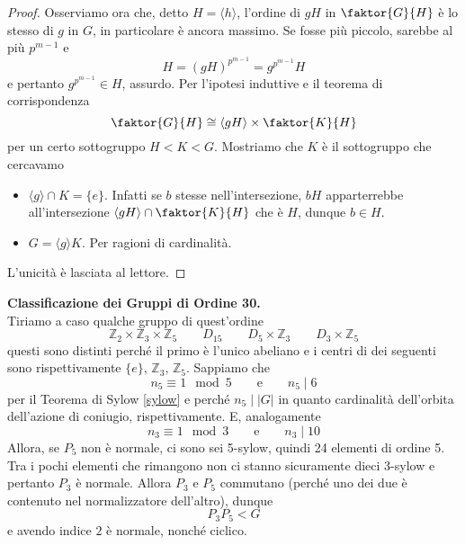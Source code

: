 \documentclass[a4paper]{article}
\theoremstyle{remark}
\theoremstyle{definition}
\begin{document}
\begin{multicols}{2}
\begin{proof}
	Osserviamo ora che, detto $ H = \langle h \rangle $, l'ordine di $ gH $ in $ \faktor{G}{H} $ è lo stesso di $ g $ in $ G $, in particolare è ancora massimo. Se fosse più piccolo, sarebbe al più $ p^{m-1} $ e
	\[ H = (gH)^{p^{m-1}} = g^{p^{m-1}}H \]
	e pertanto $ g^{p^{m-1}} \in H $, assurdo.
	 Per l'ipotesi induttive e il teorema di corrispondenza
	\[ \faktor{G}{H} \cong \langle gH \rangle \times \faktor{K}{H} \]
	per un certo sottogruppo $ H < K < G $. Mostriamo che $ K $ è il sottogruppo che cercavamo
	\begin{itemize}
		\item $ \langle g \rangle \cap K = \{e\} $. Infatti se $ b $ stesse nell'intersezione, $ bH $ apparterrebbe all'intersezione $ \langle gH \rangle \cap \faktor{K}{H} $ che è $ H $, dunque $ b \in H $.
		\item $ G = \langle g \rangle K $. Per ragioni di cardinalità. 
	\end{itemize}

L'unicità è lasciata al lettore.

\end{proof}
	
\textbf{Classificazione dei Gruppi di Ordine 30.}\\
Tiriamo a caso qualche gruppo di quest'ordine
\[ \boxed{\mathbb{Z}_2\times\mathbb{Z}_3\times\mathbb{Z}_5} \qquad \boxed{D_{15}} \qquad \boxed{D_5\times\mathbb{Z}_3} \qquad \boxed{D_{3}\times\mathbb{Z}_5} \]
questi sono distinti perché il primo è l'unico abeliano e i centri di dei seguenti sono rispettivamente $ \{e\},\, \mathbb{Z}_3,\, \mathbb{Z}_5 $. Sappiamo che
\[ n_5 \equiv 1 \mod{5} \qquad\text{e}\qquad n_5 \mid 6 \]
per il Teorema di Sylow \ref{sylow} e perché $ n_5 \mid |G| $ in quanto cardinalità dell'orbita dell'azione di coniugio, rispettivamente. E, analogamente
\[ n_3 \equiv 1 \mod{3} \qquad\text{e}\qquad n_3 \mid 10 \]
Allora, se $ P_5 $ non è normale, ci sono sei 5-sylow, quindi 24 elementi di ordine 5. Tra i pochi elementi che rimangono non ci stanno sicuramente dieci 3-sylow e pertanto $ P_3 $ è normale. Allora $ P_3 $ e $ P_5 $ commutano (perché uno dei due è contenuto nel normalizzatore dell'altro), dunque
\[ P_3P_5 < G \]
e avendo indice $ 2 $ è normale, nonché ciclico.


\end{multicols}
\end{document}
